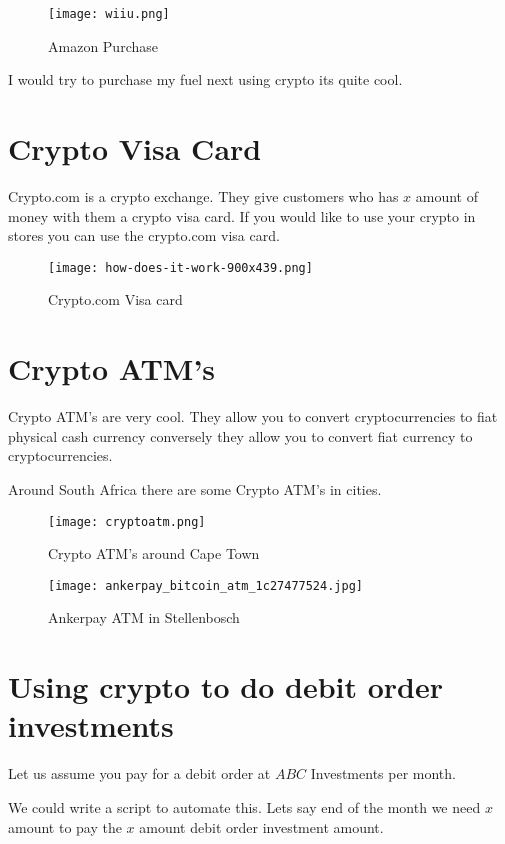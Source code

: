\begin{figure}[H]
\centering
\texttt{[image: wiiu.png]}
\caption{Amazon Purchase}
\label{fig:amazon}
\end{figure}

I would try to purchase my fuel next using crypto its quite cool.

\section{Crypto Visa Card}
Crypto.com is a crypto exchange. They give customers who has $x$ amount of money with them a crypto visa card. If you would like to use your crypto in stores you can use the crypto.com visa card.

\begin{figure}[H]
\centering
\texttt{[image: how-does-it-work-900x439.png]}
\caption{Crypto.com Visa card}
\label{fig:crypto}
\end{figure}

\section{Crypto ATM's}

Crypto ATM's are very cool. They allow you to convert cryptocurrencies to fiat physical cash currency conversely they allow you to convert fiat currency to cryptocurrencies. 

Around South Africa there are some Crypto ATM's in cities.

\begin{figure}[H]
\centering
\texttt{[image: cryptoatm.png]}
\caption{Crypto ATM's around Cape Town}
\label{fig:crypto-atm}
\end{figure}

\begin{figure}[H]
\centering
\texttt{[image: ankerpay\_bitcoin\_atm\_1c27477524.jpg]}
\caption{Ankerpay ATM in Stellenbosch}
\label{fig:ankerpay}
\end{figure}

\section{Using crypto to do debit order investments}
Let us assume you pay for a debit order at $ABC$ Investments per month.

We could write a script to automate this. Lets say end of the month we need $x$ amount to pay the $x$ amount debit order investment amount.

